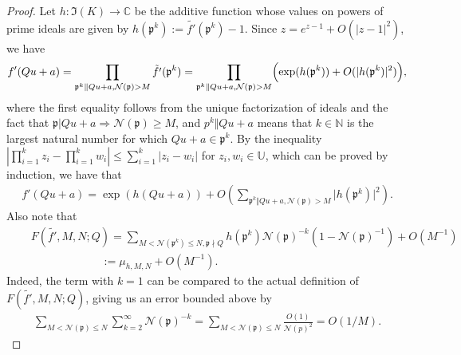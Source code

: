 \documentclass[11pt]{amsart}
\theoremstyle{definition}
\newcommand{\C}{{\mathbb C}}
\newcommand{\N}{{\mathbb N}}
\newcommand{\NN}{{\mathcal N}}
\newcommand{\U}{{\mathbb U}}
\newcommand{\mf}{\mathfrak}
\begin{document}
\begin{proof}
\fi

Let $h: \mf I(K)\to\C$ be the additive function whose values on powers of prime ideals are given by $h(\mf p^{k}):=\tilde{f'}(\mf p^{k})-1$. Since $z=e^{z-1}+O(\vert z-1\vert^{2})$, we have
$$f'(Qu+a)=\prod_{\mf p^{k}\Vert Qu+a, \NN(\mf p)>M} \tilde{f'}(\mf p^{k})=\prod_{\mf p^{k}\Vert Qu+a, \NN(\mf p)>M}\Bigl(\exp(h(\mf p^{k}))+O(\vert h(\mf p^{k})\vert^{2})\Bigr),$$
where the first equality follows from the unique factorization of ideals and the fact that $\mf p\vert Qu+a\Rightarrow \NN(\mf p)\geq M$, and $p^{k}\Vert Qu+a$ means that $k\in\N$ is the largest natural number for which $Qu+a\in{\mf p}^{k}$.
By the inequality $\left|\prod_{i=1}^{k}z_{i}-\prod_{i=1}^{k}w_{i}\right|\leq\sum_{i=1}^{k}\vert z_{i}-w_{i}\vert$ for  $z_{i},w_{i}\in\U$, which can be proved by induction, we have that
\begin{equation}\label{ffd}
    \begin{split}
       f'(Qu+a)=\exp(h(Qu+a))+O\left(\sum_{\mf p^{k}\Vert Qu+a, \NN(\mf p)>M}\vert h(\mf p^{k})\vert^{2}\right).
    \end{split}
\end{equation}
Also
note that
\begin{equation}\label{ddff}
    \begin{split}
        &\quad F(\tilde{f'},M,N;Q)=\sum_{M<\NN(\mf p^{k})\leq N, \mf p \nmid Q}h(\mf p^{k})\NN(\mf p)^{-k}(1-\NN(\mf p)^{-1})+O(M^{-1})\\&\quad\quad\quad\quad\quad\quad\quad\;:=\mu_{h,M,N}+O(M^{-1}).
    \end{split}
\end{equation}
Indeed, the term with $k=1$ can be compared to the actual definition of $F(\tilde{f'},M,N;Q)$, giving us an error bounded above by 
\begin{equation}\label{ddff3}
    \begin{split}
        \sum_{M<\NN(\mf p)\leq N} \sum_{k=2}^{\infty}\NN(\mf p)^{-k}=\sum_{M<\NN(\mf p)\leq N} \frac{O(1)}{\NN(p)^{2}}=O(1/M).
    \end{split}
\end{equation}
%


\end{proof}
\end{document}
